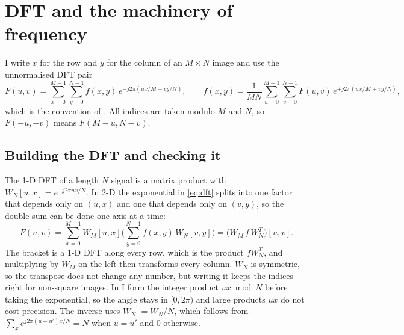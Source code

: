 \section{DFT and the machinery of frequency}

I write $x$ for the row and $y$ for the column of an $M\times N$ image and use
the unnormalised DFT pair
\begin{equation}
F(u,v)=\sum_{x=0}^{M-1}\sum_{y=0}^{N-1} f(x,y)\,e^{-j2\pi(ux/M+vy/N)},
\qquad
f(x,y)=\frac{1}{MN}\sum_{u=0}^{M-1}\sum_{v=0}^{N-1}F(u,v)\,e^{+j2\pi(ux/M+vy/N)},
\label{eq:dft}
\end{equation}
which is the convention of . All indices are taken modulo
$M$ and $N$, so $F(-u,-v)$ means $F(M-u,N-v)$.

\subsection{Building the DFT and checking it}

The 1-D DFT of a length $N$ signal is a matrix product with
$W_N[u,x]=e^{-j2\pi ux/N}$. In 2-D the exponential in \eqref{eq:dft} splits
into one factor that depends only on $(u,x)$ and one that depends only on
$(v,y)$, so the double sum can be done one axis at a time:
\begin{equation}
F(u,v)=\sum_{x=0}^{M-1}W_M[u,x]\Big(\sum_{y=0}^{N-1}f(x,y)\,W_N[v,y]\Big)
=\big(W_M\,f\,W_N^{T}\big)[u,v].
\end{equation}
The bracket is a 1-D DFT along every row, which is the product $fW_N^T$, and
multiplying by $W_M$ on the left then transforms every column. $W_N$ is
symmetric, so the transpose does not change any number, but writing it keeps
the indices right for non-square images. In  I form the
integer product $ux \bmod N$ before taking the exponential, so the angle stays
in $[0,2\pi)$ and large products $ux$ do not cost precision. The inverse uses
$W_N^{-1}=\overline{W_N}/N$, which follows from
$\sum_{x}e^{j2\pi(u-u')x/N}=N$ when $u=u'$ and $0$ otherwise.

